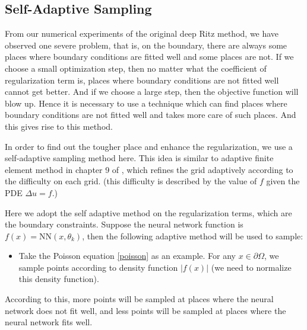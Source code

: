 \documentclass{article}
\begin{document}
\subsection{Self-Adaptive Sampling}\label{self-adaptive}
\par From our numerical experiments of the original deep Ritz method, we have observed one severe problem, that is, on the boundary, there are always some places where boundary conditions are fitted well and some places are not. If we choose a small optimization step, then no matter what the coefficient of regularization term is, places where boundary conditions are not fitted well cannot get better. And if we choose a large step, then the objective function will blow up. Hence it is necessary to use a technique which can find places where boundary conditions are not fitted well and takes more care of such places. And this gives rise to this method.
\par In order to find out the tougher place and enhance the regularization, we use a self-adaptive sampling method here. This idea is similar to adaptive finite element method in chapter 9 of \cite{brenner2007mathematical}, which refines the grid adaptively according to the difficulty on each grid. (this difficulty is described by the value of $f$ given the PDE $\Delta u = f$.) 
\par Here we adopt the self adaptive method on the regularization terms, which are the boundary constraints. Suppose the neural network function is $f(x) = \mathrm{NN}(x, \theta_k)$, then the following adaptive method will be used to sample:
\begin{itemize}
	\item Take the Poisson equation \eqref{poisson} as an example. For any $x\in\partial\Omega$, we sample points according to density function $|f(x)|$ (we need to normalize this density function).
\end{itemize}
\par  According to this, more points will be sampled at places where the neural network does not fit well, and less points will be sampled at places where the neural network fits well. 
\end{document}
